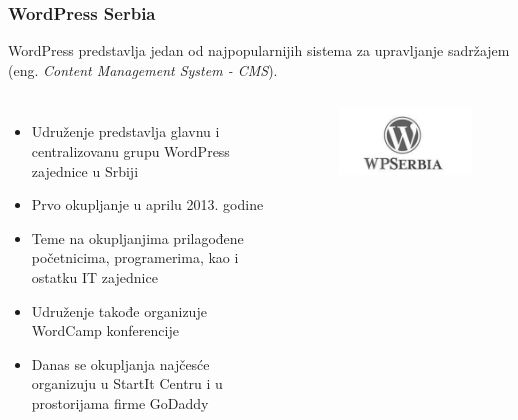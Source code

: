 \documentclass[hyperref={bookmarks=false},aspectratio=169]{beamer}
\begin{document}
\begin{frame}
\frametitle{WordPress Serbia}

WordPress predstavlja jedan od najpopularnijih sistema za upravljanje sadržajem (eng. \emph{Content Management System - CMS}).

\begin{columns}[T]
\begin{itemize}
    \item Udruženje predstavlja glavnu i centralizovanu grupu WordPress zajednice u Srbiji
    \item Prvo okupljanje u aprilu 2013. godine
    \item Teme na okupljanjima prilagođene početnicima, programerima, kao i ostatku IT zajednice 
    \item Udruženje takođe organizuje WordCamp konferencije
    \item Danas se okupljanja najčesće organizuju u StartIt Centru i u prostorijama firme GoDaddy
\end{itemize}



\begin{figure}
    \raggedleft
    \includegraphics[scale=0.4]{./images/wp.jpg}
\end{figure}

\end{columns}
\end{frame}
\end{document}
